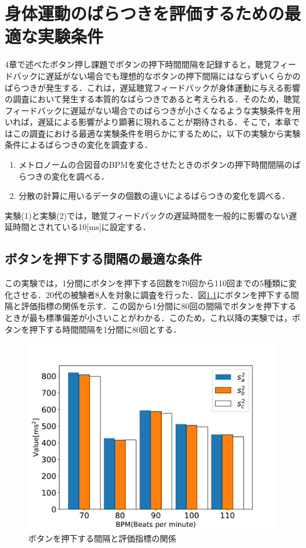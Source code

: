 \chapter{身体運動のばらつきを評価するための最適な実験条件}
4章で述べたボタン押し課題でボタンの押下時間間隔を記録すると，聴覚フィードバックに遅延がない場合でも理想的なボタンの押下間隔にはならずいくらかのばらつきが発生する．これは，遅延聴覚フィードバックが身体運動に与える影響の調査において発生する本質的なばらつきであると考えられる．そのため，聴覚フィードバックに遅延がない場合でのばらつきが小さくなるような実験条件を用いれば，遅延による影響がより顕著に現れることが期待される．そこで，本章ではこの調査における最適な実験条件を明らかにするために，以下の実験から実験条件によるばらつきの変化を調査する．
\begin{enumerate}[leftmargin=*, label=実験(\arabic*)] %
  \item メトロノームの合図音のBPMを変化させたときのボタンの押下時間間隔のばらつきの変化を調べる．
  \item 分散の計算に用いるデータの個数の違いによるばらつきの変化を調べる．
\end{enumerate}
実験(1)と実験(2)では，聴覚フィードバックの遅延時間を一般的に影響のない遅延時間とされている10[ms]に設定する．
\section{ボタンを押下する間隔の最適な条件}
この実験では，1分間にボタンを押下する回数を70回から110回までの5種類に変化させる．20代の被験者8人を対象に調査を行った．図\ref{fig:bpm}にボタンを押下する間隔と評価指標の関係を示す．この図から1分間に80回の間隔でボタンを押下するときが最も標準偏差が小さいことがわかる．このため，これ以降の実験では，ボタンを押下する時間間隔を1分間に80回とする．
\begin{figure}[b]
  \centering
  \includegraphics[scale=0.6]{figures/Yobi/Var/BPM-Change-Var.pdf}
  \caption{ボタンを押下する間隔と評価指標の関係}
  \label{fig:bpm}
\end{figure}
